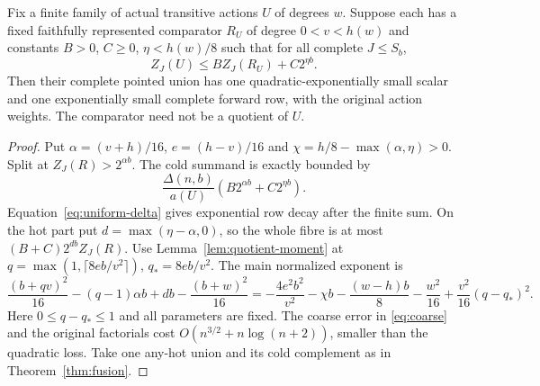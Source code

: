 \begin{theorem}\label{thm:finite-comparator}
Fix a finite family of actual transitive actions $U$ of degrees $w$.
Suppose each has a fixed faithfully represented comparator $R_U$ of
degree $0<v<h(w)$ and constants $B>0$, $C\geq0$, $\eta<h(w)/8$
such that for all complete $J\leq S_b$,
\[
 Z_J(U)\leq BZ_J(R_U)+C2^{\eta b}.
\]
Then their complete pointed union has one quadratic-exponentially
small scalar and one exponentially small complete forward row, with
the original action weights. The comparator need not be a quotient
of $U$.
\end{theorem}
\begin{proof}
Put $\alpha=(v+h)/16$, $e=(h-v)/16$ and
$\chi=h/8-\max(\alpha,\eta)>0$. Split at
$Z_J(R)>2^{\alpha b}$. The cold summand is exactly bounded by
\[
 \frac{\Delta(n,b)}{a(U)}
           (B2^{\alpha b}+C2^{\eta b}).
\]
Equation~\eqref{eq:uniform-delta} gives exponential row decay after
the finite sum. On the hot part put $d=\max(\eta-\alpha,0)$, so
the whole fibre is at most $(B+C)2^{db}Z_J(R)$.
Use Lemma~\ref{lem:quotient-moment} at
$q=\max(1,\lceil8eb/v^2\rceil)$, $q_*=8eb/v^2$.
The main normalized exponent is
\[
 \frac{(b+qv)^2}{16}-(q-1)\alpha b+db-\frac{(b+w)^2}{16}
 =-\frac{4e^2b^2}{v^2}-\chi b-\frac{(w-h)b}{8}
   -\frac{w^2}{16}+\frac{v^2}{16}(q-q_*)^2.
\]
Here $0\leq q-q_*\leq1$ and all parameters are fixed. The coarse
error in \eqref{eq:coarse} and the original factorials cost
$O(n^{3/2}+n\log(n+2))$, smaller than the quadratic loss.
Take one any-hot union and its cold complement as in
Theorem~\ref{thm:fusion}.
\end{proof}

